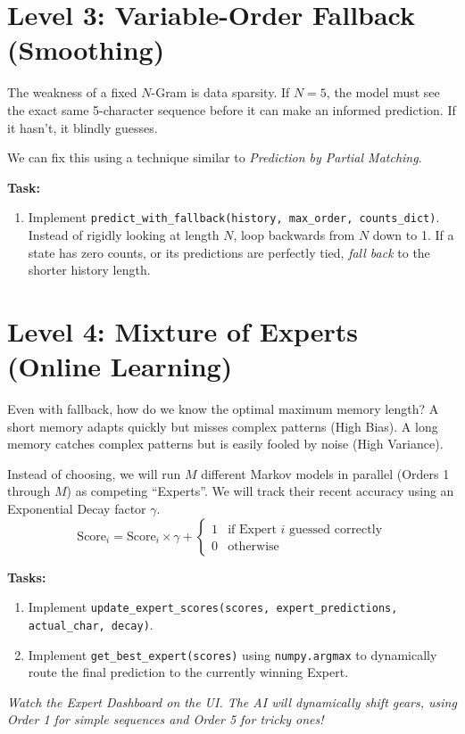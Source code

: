 \documentclass[12pt]{article}
\begin{document}
\section{Level 3: Variable-Order Fallback (Smoothing)}
The weakness of a fixed $N$-Gram is data sparsity. If $N=5$, the model must see the exact same 5-character sequence before it can make an informed prediction. If it hasn't, it blindly guesses.

We can fix this using a technique similar to \textit{Prediction by Partial Matching}. 

\textbf{Task:}
\begin{enumerate}
    \item Implement \texttt{predict\_with\_fallback(history, max\_order, counts\_dict)}. Instead of rigidly looking at length $N$, loop backwards from $N$ down to 1. If a state has zero counts, or its predictions are perfectly tied, \textit{fall back} to the shorter history length.
\end{enumerate}

\section{Level 4: Mixture of Experts (Online Learning)}
Even with fallback, how do we know the optimal maximum memory length? A short memory adapts quickly but misses complex patterns (High Bias). A long memory catches complex patterns but is easily fooled by noise (High Variance).

Instead of choosing, we will run $M$ different Markov models in parallel (Orders 1 through $M$) as competing ``Experts''. We will track their recent accuracy using an Exponential Decay factor $\gamma$.
$$ \text{Score}_{i} = \text{Score}_{i} \times \gamma + \begin{cases} 1 & \text{if Expert } i \text{ guessed correctly} \\ 0 & \text{otherwise} \end{cases} $$

\textbf{Tasks:}
\begin{enumerate}
    \item Implement \texttt{update\_expert\_scores(scores, expert\_predictions, actual\_char, decay)}.
    \item Implement \texttt{get\_best\_expert(scores)} using \texttt{numpy.argmax} to dynamically route the final prediction to the currently winning Expert.
\end{enumerate}
\textit{Watch the Expert Dashboard on the UI. The AI will dynamically shift gears, using Order 1 for simple sequences and Order 5 for tricky ones!}
\end{document}
